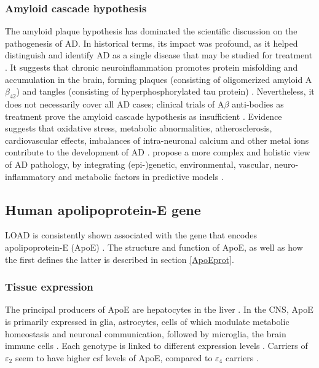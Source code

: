 \documentclass{amsart}
\theoremstyle{plain}
\begin{document}
\subsubsection{Amyloid cascade hypothesis}
The amyloid plaque hypothesis has dominated the scientific discussion on the pathogenesis of AD. In historical terms, its impact was profound, as it helped distinguish and identify AD as a single disease that may be studied for treatment \cite{Hardy2006AlzheimersReappraisal}. It suggests that chronic neuroinflammation promotes protein misfolding and accumulation in the brain, forming plaques (consisting of oligomerized amyloid A$\beta_{42}$) and tangles (consisting of hyperphosphorylated tau protein) \cite{Edwards2019ANeurodegeneration}. Nevertheless, it does not necessarily cover all AD cases; clinical trials of A$\beta$ anti-bodies as treatment prove the amyloid cascade hypothesis as insufficient \cite{Kepp2023TheReview,Kurkinen2023TheThinking}. Evidence suggests that oxidative stress, metabolic abnormalities, atherosclerosis, cardiovascular effects, imbalances of intra-neuronal calcium and other metal ions contribute to the development of AD \cite{Kepp2023TheReview}. \citeauthor{Kepp2023TheReview} propose a more complex and holistic view of AD pathology, by integrating (epi-)genetic, environmental, vascular, neuro-inflammatory and metabolic factors in predictive models \cite{Kepp2023TheReview}.

\subsection{Human apolipoprotein-E gene}
LOAD is consistently shown associated with the gene that encodes apolipoprotein-E (ApoE) \cite{Corder1993GeneFamilies}. The structure and function of ApoE, as well as how the first defines the latter is described in section \ref{ApoEprot}.

\subsubsection{Tissue expression}
The principal producers of ApoE are hepatocytes in the liver \cite{Mahley2016CentralMetabolism}. In the CNS, ApoE is primarily expressed in glia, astrocytes, cells of which modulate metabolic homeostasis and neuronal communication, followed by microglia, the brain immune cells \cite{Lanfranco2021ExpressionInflammation}. Each genotype is linked to different expression levels \cite{Husain2021APOETherapeutics}. Carriers of $\varepsilon_2$ seem to have higher \acrfull{csf} levels of ApoE, compared to $\varepsilon_4$ carriers \cite{Castellano2011HumanClearance, Cruchaga2012CerebrospinalDisease}. 
\end{document}
